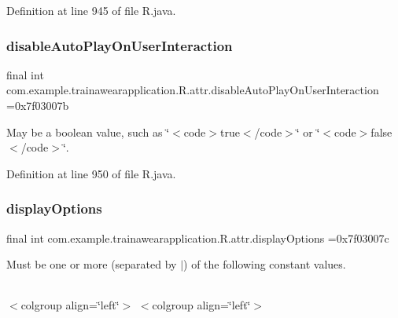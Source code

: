Definition at line 945 of file R.\+java.

\mbox{\label{classcom_1_1example_1_1trainawearapplication_1_1_r_1_1attr_ab20872c8a6437aa1d784b7ce8e35930a}} 
\subsubsection{\texorpdfstring{disableAutoPlayOnUserInteraction}{disableAutoPlayOnUserInteraction}}
{\footnotesize\ttfamily final int com.\+example.\+trainawearapplication.\+R.\+attr.\+disable\+Auto\+Play\+On\+User\+Interaction =0x7f03007b\hspace{0.3cm}{\ttfamily [static]}}

May be a boolean value, such as \char`\"{}$<$code$>$true$<$/code$>$\char`\"{} or \char`\"{}$<$code$>$false$<$/code$>$\char`\"{}. 

Definition at line 950 of file R.\+java.

\mbox{\label{classcom_1_1example_1_1trainawearapplication_1_1_r_1_1attr_a89cf32b7ad1c11198b9912d6adeb544a}} 
\subsubsection{\texorpdfstring{displayOptions}{displayOptions}}
{\footnotesize\ttfamily final int com.\+example.\+trainawearapplication.\+R.\+attr.\+display\+Options =0x7f03007c\hspace{0.3cm}{\ttfamily [static]}}

Must be one or more (separated by \textquotesingle{}$\vert$\textquotesingle{}) of the following constant values.

\tabulinesep=1mm
\begin{longtabu}spread 0pt [c]{*{0}{|X[-1]}|}
\hline
\end{longtabu}
$<$colgroup align=\char`\"{}left\char`\"{}$>$ $<$colgroup align=\char`\"{}left\char`\"{}$>$ 

